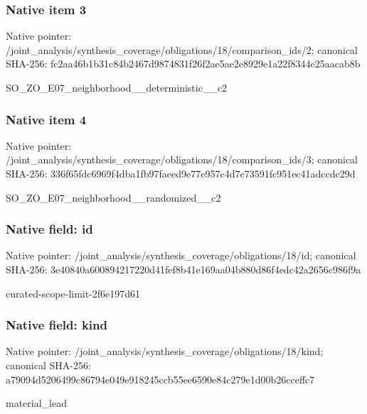 \documentclass[10pt,a4paper]{article}
\begin{document}
\subsubsection{Native item 3}
Native pointer: /joint\_\allowbreak{}analysis/synthesis\_\allowbreak{}coverage/obligations/18/comparison\_\allowbreak{}ids/2; canonical SHA-256: fc2aa46b1b31c84b2467d9874831f26f2ae5ae2e8929e1a22f8344e25aacab8b

\begingroup\raggedright\sloppy SO\_\allowbreak{}ZO\_\allowbreak{}E07\_\allowbreak{}neighborhood\_\allowbreak{}\_\allowbreak{}deterministic\_\allowbreak{}\_\allowbreak{}c2\par\endgroup

\subsubsection{Native item 4}
Native pointer: /joint\_\allowbreak{}analysis/synthesis\_\allowbreak{}coverage/obligations/18/comparison\_\allowbreak{}ids/3; canonical SHA-256: 336f65fdc6969f4dba1fb97faeed9e77e957c4d7c73591fc951ec41adccdc29d

\begingroup\raggedright\sloppy SO\_\allowbreak{}ZO\_\allowbreak{}E07\_\allowbreak{}neighborhood\_\allowbreak{}\_\allowbreak{}randomized\_\allowbreak{}\_\allowbreak{}c2\par\endgroup

\subsubsection{Native field: id}
Native pointer: /joint\_\allowbreak{}analysis/synthesis\_\allowbreak{}coverage/obligations/18/id; canonical SHA-256: 3e40840a600894217220d41fef8b41e169aa04b880d86f4edc42a2656c986f9a

\begingroup\raggedright\sloppy curated-scope-limit-2f6e197d61\par\endgroup

\subsubsection{Native field: kind}
Native pointer: /joint\_\allowbreak{}analysis/synthesis\_\allowbreak{}coverage/obligations/18/kind; canonical SHA-256: a79094d5206499c86794e049e918245ccb55ee6590e84c279e1d00b26cceffc7

\begingroup\raggedright\sloppy material\_\allowbreak{}lead\par\endgroup
\end{document}
